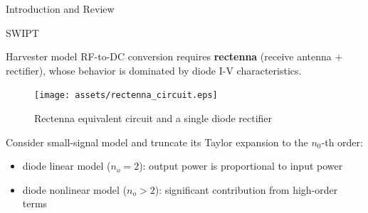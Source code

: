 \documentclass[9pt]{beamer}
\begin{document}
\begin{section}{Introduction and Review}
\begin{subsection}{SWIPT}
		\begin{frame}{Harvester model}
			RF-to-DC conversion requires \textbf{rectenna} (receive antenna + rectifier), whose behavior is dominated by diode I-V characteristics.
			\begin{figure}
				\centering
				\texttt{[image: assets/rectenna\_circuit.eps]}
				\caption{Rectenna equivalent circuit and a single diode rectifier \cite{Clerckx2018a}}
			\end{figure}
			Consider small-signal model and truncate its Taylor expansion to the $n_0$-th order:
			\begin{itemize}
				\item diode linear model (${n_o} = 2$): output power is proportional to input power
				\item \alert{diode nonlinear model} (${n_o} > 2$): significant contribution from high-order terms
			\end{itemize}
		\end{frame}


\end{subsection}
\end{section}
\end{document}
